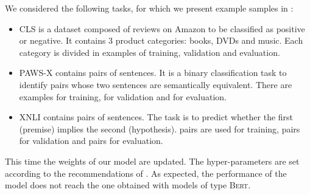 We considered the following tasks, for which we present example samples in :
\begin{itemize}
    \item CLS is a dataset composed of reviews on Amazon to be classified as positive or negative. It contains 3 product categories: books, DVDs and music. Each category is divided in  examples of training, validation and evaluation. 
    \item PAWS-X contains pairs of sentences. It is a binary classification task to identify pairs whose two sentences are semantically equivalent. There are  examples for training,  for validation and  for evaluation.
    \item XNLI contains pairs of sentences. The task is to predict whether the first (premise) implies the second (hypothesis).  pairs are used for training,  pairs for validation and  pairs for evaluation.
\end{itemize}

This time the weights of our model are updated. The hyper-parameters are set according to the recommendations of \textcite{le_20b, le_20a}. As expected, the performance of the model does not reach the one obtained with models of type \textsc{Bert}. 

\begin{table}[!ht]
\footnotesize
{}
\caption{Accuracy scores for the discriminative tasks of the FLUE benchmark. The symbol $\dagger$ denotes the reported scores of \textcite{le_20a, le_20b}. We indicate the best results in each section in \textbf{bold}, we \underline{underline} the best results overall.}
\end{table}

